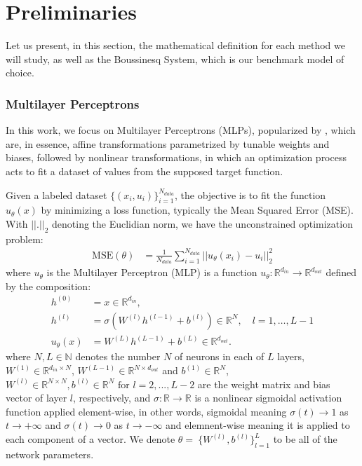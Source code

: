 
\chapter{Preliminaries}

Let us present, in this section, the mathematical definition for each method we
will study, as well as the Boussinesq System, which is our benchmark model of
choice.

\subsection{Multilayer Perceptrons}

In this work, we focus on Multilayer Perceptrons (MLPs), popularized by
\textcite{rumelhart1986}, which are, in essence, affine transformations
parametrized by tunable weights and biases, followed by nonlinear
transformations, in which an optimization process acts to fit a dataset of
values from the supposed target function.

Given a labeled dataset ${\{(x_i, u_i)\}}_{i=1}^{N_{data}}$, the objective is
to fit the function $u_{\theta}(x)$ by minimizing a loss function, typically
the Mean Squared Error (MSE). With $||.||_2$ denoting the Euclidian norm, we
have the unconstrained optimization problem:
\begin{align}
    \text{MSE}(\theta) & = \frac{1}{N_{data}} \sum_{i=1}^{N_{data}} {|| u_{\theta}(x_i) - u_i ||}_2^2 \label{eq:data_loss_nn}
\end{align}
\noindent where $u_{\theta}$ is the Multilayer Perceptron (MLP) is a function $u_\theta: \mathbb{R}^{d_{in}} \to \mathbb{R}^{d_{out}}$ defined by the composition:
\begin{align}
    h^{(0)}       & = x \in \mathbb{R}^{d_{in}}, \label{eq:input}                                                                      \\
    h^{(l)}       & = \sigma \left( W^{(l)} h^{(l-1)} + b^{(l)} \right) \in \mathbb{R}^{N} , \quad l = 1, \dots, L-1 \label{eq:hidden} \\
    u_{\theta}(x) & = W^{(L)} h^{(L-1)} + b^{(L)} \in \mathbb{R}^{d_{out}}. \label{eq:output}
\end{align}
\noindent where $N, L \in \mathbb{N}$ denotes the number $N$ of neurons in each of $L$ layers, $W^{(1)} \in \mathbb{R}^{d_{in} \times N}$, $W^{(L-1)} \in \mathbb{R}^{N \times d_{out}}$ and $b^{(1)} \in \mathbb{R}^{N}$, $W^{(l)} \in \mathbb{R}^{N\times N}, b^{(l)} \in \mathbb{R}^{N} \text{ for } l = 2, ..., L - 2$ are the weight matrix and bias vector of layer $l$, respectively, and $\sigma: \mathbb{R} \to \mathbb{R}$ is a nonlinear sigmoidal activation function applied element-wise, in other words, sigmoidal meaning $\sigma(t) \to 1$ as $t \to +\infty$ and $\sigma(t) \to 0$ as $t \to -\infty$ and elemnent-wise meaning it is applied to each component of a vector. We denote $\theta = \ \{W^{(l)}, b^{(l)}\}_{l=1}^{L}$ to be all of the network parameters.

